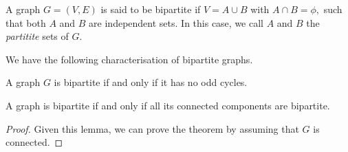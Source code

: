\begin{definition}
	A graph $G = (V, E)$ is said to be bipartite if $V = A \cup  B$ with
	$ A \cap B = \phi,$ such that both $A$ and $B$ are independent sets.
	In this case, we call $A$ and $B$ the \emph{partitite} sets of $G.$
\end{definition}

We have the following characterisation of bipartite graphs.



\begin{theorem}[K\"onig]
	A graph $G$ is bipartite if and only if it has no odd cycles.
\end{theorem}

\begin{lemma}
	A graph is bipartite if and only if all its connected components are bipartite.
\end{lemma}

\begin{proof}	
	Given this lemma, we can prove the theorem by assuming that $G$ is connected.
\end{proof}
